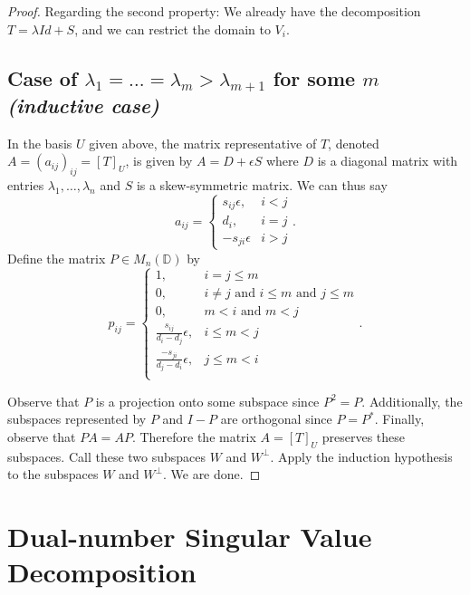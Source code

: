 \documentclass[
]{article}
\theoremstyle{theorem}
\theoremstyle{proposition}
\begin{document}
\begin{proof}
Regarding the second property: We already have the decomposition \(T = \lambda Id + S\), and we can restrict the domain to \(V_i\).

\hypertarget{case-of-lambda_1-dots-lambda_m-lambda_m1-for-some-m-inductive-case}{%
\subsection*{\texorpdfstring{Case of \(\lambda_1 = \dots = \lambda_m > \lambda_{m+1}\) for some \(m\) \emph{(inductive case)}}{Case of \textbackslash lambda\_1 = \textbackslash dots = \textbackslash lambda\_m \textgreater{} \textbackslash lambda\_\{m+1\} for some m (inductive case)}}\label{case-of-lambda_1-dots-lambda_m-lambda_m1-for-some-m-inductive-case}}

In the basis \(U\) given above, the matrix representative of \(T\), denoted \(A = (a_{ij})_{ij} = [T]_U\), is given by \(A = D + \epsilon S\) where \(D\) is a diagonal matrix with entries \(\lambda_1, \dotsc, \lambda_n\) and \(S\) is a skew-symmetric matrix. We can thus say \[a_{ij} = \begin{cases}s_{ij}\epsilon, & i < j \\ d_i, & i = j \\ -s_{ji}\epsilon & i > j \end{cases}.\] Define the matrix \(P \in M_n(\mathbb D)\) by \[p_{ij} = \begin{cases}
1 , &i = j \leq m \\
0, &i \neq j \text{ and } i\leq m \text{ and } j\leq m \\
0, &m < i\text{ and } m < j\\
\frac{s_{ij}}{d_i - d_j}\epsilon, &i \leq m < j \\
\frac{-s_{ji}}{d_j - d_i}\epsilon, &j \leq m < i \\
\end{cases}.\]

Observe that \(P\) is a projection onto some subspace since \(P^2 = P\). Additionally, the subspaces represented by \(P\) and \(I - P\) are orthogonal since \(P = P^*\). Finally, observe that \(PA = AP\). Therefore the matrix \(A = [T]_U\) preserves these subspaces. Call these two subspaces \(W\) and \(W^\perp\). Apply the induction hypothesis to the subspaces \(W\) and \(W^\perp\). We are done.

\end{proof}

\section{Dual-number Singular Value Decomposition}
\end{document}
